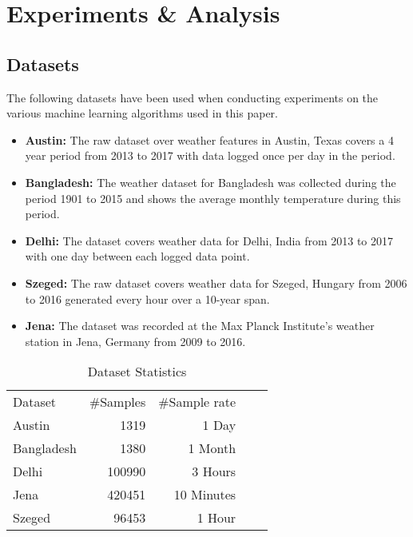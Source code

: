 \section{Experiments \& Analysis}

\label{sec:ExpRes}
\subsection{Datasets}
The following datasets have been used when conducting experiments on the various machine learning algorithms used in this paper.
\begin{itemize}
    \item \textbf{Austin:} The raw dataset over weather features in Austin, Texas covers a 4 year period from 2013 to 2017 with data logged once per day in the period.
    \item \textbf{Bangladesh:} The weather dataset for Bangladesh was collected during the period 1901 to 2015 and shows the average monthly temperature during this period. 
    \item \textbf{Delhi:} The dataset covers weather data for Delhi, India from 2013 to 2017 with one day between each logged data point.
    \item \textbf{Szeged:} The raw dataset covers weather data for Szeged, Hungary from 2006 to 2016 generated every hour over a 10-year span.
    \item \textbf{Jena:} The dataset was recorded at the Max Planck Institute's weather station in Jena, Germany from 2009 to 2016.
\end{itemize}

\begin{table}[!ht]
\centering
\caption {Dataset Statistics} \label{tab:DatasetTable}
\begin{tabular}{|l|r|r|ll}
\cline{1-3}
Dataset    & \multicolumn{1}{l|}{\#Samples} & \multicolumn{1}{l|}{\#Sample rate} &  &  \\ \cline{1-3}
Austin     & 1319                           & 1 Day                              &  &  \\ \cline{1-3}
Bangladesh & 1380                           & 1 Month                            &  &  \\ \cline{1-3}
Delhi      & 100990                         & 3 Hours                            &  &  \\ \cline{1-3}
Jena       & 420451                         & 10 Minutes                         &  &  \\ \cline{1-3}
Szeged     & 96453                          & 1 Hour                             &  &  \\ \cline{1-3}
\end{tabular}
\end{table}

